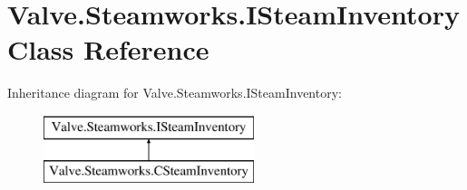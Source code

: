 \hypertarget{classValve_1_1Steamworks_1_1ISteamInventory}{}\section{Valve.\+Steamworks.\+I\+Steam\+Inventory Class Reference}
\label{classValve_1_1Steamworks_1_1ISteamInventory}
Inheritance diagram for Valve.\+Steamworks.\+I\+Steam\+Inventory\+:\begin{figure}[H]
\begin{center}
\leavevmode
\includegraphics[height=2.000000cm]{classValve_1_1Steamworks_1_1ISteamInventory}
\end{center}
\end{figure}

